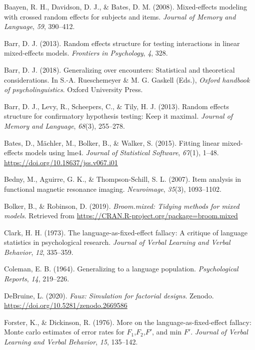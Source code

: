 \documentclass[
  english,
  doc,floatsintext]{apa6}
\begin{document}
\leavevmode\hypertarget{ref-baayen_davidson_bates_2008}{}%
Baayen, R. H., Davidson, D. J., \& Bates, D. M. (2008). Mixed-effects modeling with crossed random effects for subjects and items. \emph{Journal of Memory and Language}, \emph{59}, 390--412.

\leavevmode\hypertarget{ref-barr_2013}{}%
Barr, D. J. (2013). Random effects structure for testing interactions in linear mixed-effects models. \emph{Frontiers in Psychology}, \emph{4}, 328.

\leavevmode\hypertarget{ref-barr_2018}{}%
Barr, D. J. (2018). Generalizing over encounters: Statistical and theoretical considerations. In S.-A. Rueschemeyer \& M. G. Gaskell (Eds.), \emph{Oxford handbook of psycholinguistics}. Oxford University Press.

\leavevmode\hypertarget{ref-barr_et_al_2013}{}%
Barr, D. J., Levy, R., Scheepers, C., \& Tily, H. J. (2013). Random effects structure for confirmatory hypothesis testing: Keep it maximal. \emph{Journal of Memory and Language}, \emph{68}(3), 255--278.

\leavevmode\hypertarget{ref-R-lme4}{}%
Bates, D., Mächler, M., Bolker, B., \& Walker, S. (2015). Fitting linear mixed-effects models using lme4. \emph{Journal of Statistical Software}, \emph{67}(1), 1--48. \url{https://doi.org/10.18637/jss.v067.i01}

\leavevmode\hypertarget{ref-bedny_aguirre_thompson-schill_2007}{}%
Bedny, M., Aguirre, G. K., \& Thompson-Schill, S. L. (2007). Item analysis in functional magnetic resonance imaging. \emph{Neuroimage}, \emph{35}(3), 1093--1102.

\leavevmode\hypertarget{ref-R-broom.mixed}{}%
Bolker, B., \& Robinson, D. (2019). \emph{Broom.mixed: Tidying methods for mixed models}. Retrieved from \url{https://CRAN.R-project.org/package=broom.mixed}

\leavevmode\hypertarget{ref-clark_1973}{}%
Clark, H. H. (1973). The language-as-fixed-effect fallacy: A critique of language statistics in psychological research. \emph{Journal of Verbal Learning and Verbal Behavior}, \emph{12}, 335--359.

\leavevmode\hypertarget{ref-coleman_1964}{}%
Coleman, E. B. (1964). Generalizing to a language population. \emph{Psychological Reports}, \emph{14}, 219--226.

\leavevmode\hypertarget{ref-R-faux}{}%
DeBruine, L. (2020). \emph{Faux: Simulation for factorial designs}. Zenodo. \url{https://doi.org/10.5281/zenodo.2669586}

\leavevmode\hypertarget{ref-forster_dickinson_1976}{}%
Forster, K., \& Dickinson, R. (1976). More on the language-as-fixed-effect fallacy: Monte carlo estimates of error rates for \(F_1\),\(F_2\),\(F'\), and min \(F'\). \emph{Journal of Verbal Learning and Verbal Behavior}, \emph{15}, 135--142.
\end{document}

